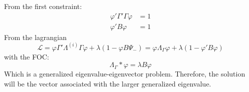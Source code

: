 \documentclass[12pt, a4paper]{article}
\begin{document}
From the first constraint:
\begin{align*}
	\varphi'\Gamma'\Gamma \varphi &= 1 \\
	\varphi' B \varphi &= 1
\end{align*}
From the lagrangian
\begin{equation*}
	\mathcal{L} = \varphi\Gamma'\Lambda^{(i)}\Gamma\varphi + \lambda(1-\varphi B \Psi_{-} ) = \varphi\Lambda_{\Gamma}\varphi + \lambda(1-\varphi' B \varphi )
\end{equation*}
with the FOC:
\begin{equation*}
	\Lambda_{\Gamma}*\varphi = \lambda B \varphi
\end{equation*}
Which is a generalized eigenvalue-eigenvector problem. Therefore, the solution will be the vector associated with the larger generalized eigenvalue.
\end{document}
